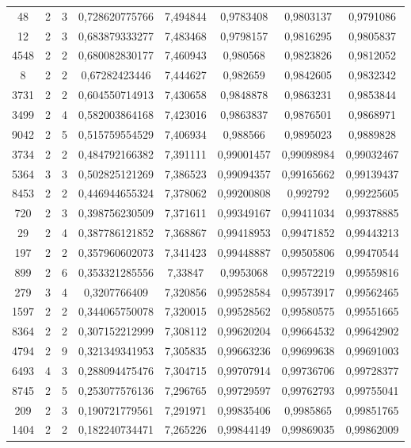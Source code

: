 \begin{longtable}{|c|c|c|c|c|c|c|c|}
48 & 2 & 3 & 0,728620775766 & 7,494844 & 0,9783408 & 0,9803137 & 0,9791086 \\
12 & 2 & 3 & 0,683879333277 & 7,483468 & 0,9798157 & 0,9816295 & 0,9805837 \\
4548 & 2 & 2 & 0,680082830177 & 7,460943 & 0,980568 & 0,9823826 & 0,9812052 \\
8 & 2 & 2 & 0,67282423446 & 7,444627 & 0,982659 & 0,9842605 & 0,9832342 \\
3731 & 2 & 2 & 0,604550714913 & 7,430658 & 0,9848878 & 0,9863231 & 0,9853844 \\
3499 & 2 & 4 & 0,582003864168 & 7,423016 & 0,9863837 & 0,9876501 & 0,9868971 \\
9042 & 2 & 5 & 0,515759554529 & 7,406934 & 0,988566 & 0,9895023 & 0,9889828 \\
3734 & 2 & 2 & 0,484792166382 & 7,391111 & 0,99001457 & 0,99098984 & 0,99032467 \\
5364 & 3 & 3 & 0,502825121269 & 7,386523 & 0,99094357 & 0,99165662 & 0,99139437 \\
8453 & 2 & 2 & 0,446944655324 & 7,378062 & 0,99200808 & 0,992792 & 0,99225605 \\
720 & 2 & 3 & 0,398756230509 & 7,371611 & 0,99349167 & 0,99411034 & 0,99378885 \\
29 & 2 & 4 & 0,387786121852 & 7,368867 & 0,99418953 & 0,99471852 & 0,99443213 \\
197 & 2 & 2 & 0,357960602073 & 7,341423 & 0,99448887 & 0,99505806 & 0,99470544 \\
899 & 2 & 6 & 0,353321285556 & 7,33847 & 0,9953068 & 0,99572219 & 0,99559816 \\
279 & 3 & 4 & 0,3207766409 & 7,320856 & 0,99528584 & 0,99573917 & 0,99562465 \\
1597 & 2 & 2 & 0,344065750078 & 7,320015 & 0,99528562 & 0,99580575 & 0,99551665 \\
8364 & 2 & 2 & 0,307152212999 & 7,308112 & 0,99620204 & 0,99664532 & 0,99642902 \\
4794 & 2 & 9 & 0,321349341953 & 7,305835 & 0,99663236 & 0,99699638 & 0,99691003 \\
6493 & 4 & 3 & 0,288094475476 & 7,304715 & 0,99707914 & 0,99736706 & 0,99728377 \\
8745 & 2 & 5 & 0,253077576136 & 7,296765 & 0,99729597 & 0,99762793 & 0,99755041 \\
209 & 2 & 3 & 0,190721779561 & 7,291971 & 0,99835406 & 0,9985865 & 0,99851765 \\
1404 & 2 & 2 & 0,182240734471 & 7,265226 & 0,99844149 & 0,99869035 & 0,99862009 \\

\end{longtable}
